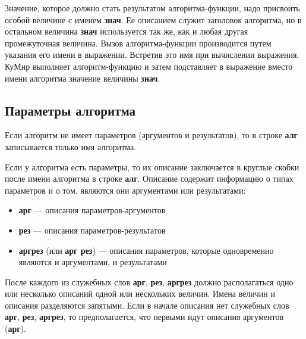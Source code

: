 \documentclass[12pt,a4paper]{article}
\begin{document}
	Значение, которое должно стать результатом алгоритма-функции, надо присвоить особой величине с именем \textbf{знач}. Ее описанием служит заголовок алгоритма, но в остальном величина \textbf{знач} используется так же, как и любая другая промежуточная величина. Вызов алгоритма-функции производится путем указания его имени в выражении. Встретив это имя при вычислении выражения, КуМир выполняет алгоритм-функцию и затем подставляет в выражение вместо имени алгоритма значение величины \textbf{знач}.

\subsection{Параметры алгоритма}
\label{parameters}

Если алгоритм не имеет параметров (аргументов и результатов), то в строке \textbf{алг} записывается только имя алгоритма.

	Если у алгоритма есть параметры, то их описание заключается в круглые скобки после имени алгоритма в строке \textbf{алг}. Описание содержит информацию о типах параметров и о том, являются они аргументами или результатами:
\begin{itemize}
\item \textbf{арг} --- описания параметров-аргументов
\item \textbf{рез} --- описания параметров-результатов
\item \textbf{аргрез} (или \textbf{арг рез}) --- описания параметров, которые одновременно являются и аргументами, и результатами
\end{itemize}

	После каждого из служебных слов \textbf{арг}, \textbf{рез}, \textbf{аргрез} должно располагаться одно или несколько описаний одной или нескольких величин. Имена величин и описания разделяются запятыми. Если в начале описания нет служебных слов \textbf{арг}, \textbf{рез}, \textbf{аргрез}, то предполагается, что первыми идут описания аргументов (\textbf{арг}).
\end{document}
